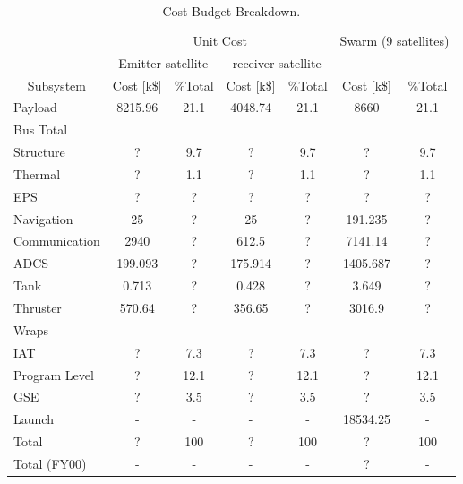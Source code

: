 \begin{table}[ht!]
\centering
\begin{tabular}{l|c|c|c|c|c|c|}
\cline{2-7}
  & \multicolumn{4}{|c|}{Unit Cost} & \multicolumn{2}{|c|}{\multirow{2}{*}{Swarm (9 satellites)}} \\\cline{2-5}
  
  & \multicolumn{2}{|c|}{Emitter satellite} & \multicolumn{2}{|c|}{receiver satellite} & \multicolumn{2}{|c|}{ } \\\hline
  
 \multicolumn{1}{|c|}{Subsystem} & Cost [k\$] & \%Total & Cost [k\$] & \%Total & Cost [k\$] & \%Total \\\hline
 \multicolumn{1}{|l|}{Payload}       & 8215.96 & 21.1 & 4048.74 & 21.1 & 8660 & 21.1 \\\hline
 \multicolumn{7}{|l|}{Bus Total}     \\\hline
 \multicolumn{1}{|l|}{Structure}     & ? & 9.7 & ? & 9.7 & ? & 9.7 \\\hline
 \multicolumn{1}{|l|}{Thermal}       & ? & 1.1 & ? & 1.1 & ? & 1.1 \\\hline
 \multicolumn{1}{|l|}{EPS}           & ? & ? & ?   & ? & ? & ? \\\hline
 \multicolumn{1}{|l|}{Navigation}    & 25      & ? & 25        & ? & 191.235 & ? \\\hline
 \multicolumn{1}{|l|}{Communication} & 2940 & ? & 612.5 & ? & 7141.14 & ? \\\hline
 \multicolumn{1}{|l|}{\acs{ADCS}}    & 199.093 & ? & 175.914 & ? & 1405.687 & ? \\\hline
 \multicolumn{1}{|l|}{Tank}          & 0.713   & ? & 0.428   & ? & 3.649 & ? \\\hline
 \multicolumn{1}{|l|}{Thruster}      & 570.64  & ? & 356.65  & ? & 3016.9 & ? \\\hline
 \multicolumn{7}{|l|}{Wraps}     \\\hline
 \multicolumn{1}{|l|}{\acs{IAT}}     & ? & 7.3 & ? & 7.3 & ? & 7.3 \\\hline
 \multicolumn{1}{|l|}{Program Level} & ? & 12.1 & ? & 12.1 & ? & 12.1 \\\hline
 \multicolumn{1}{|l|}{\acs{GSE}}     & ? & 3.5 & ? & 3.5 & ? & 3.5 \\\hline
 \multicolumn{1}{|l|}{Launch}        & - & - & - & - & 18534.25 & - \\\hline\hline\hline
 \multicolumn{1}{|l|}{Total}         & ? & 100 & ? & 100 & ? & 100 \\\hline
 \multicolumn{1}{|l|}{Total (FY00)}  & - & - & - & - & ? & - \\\hline
 
\end{tabular}
\caption{Cost Budget Breakdown.}
\label{tab:CB}
\end{table}